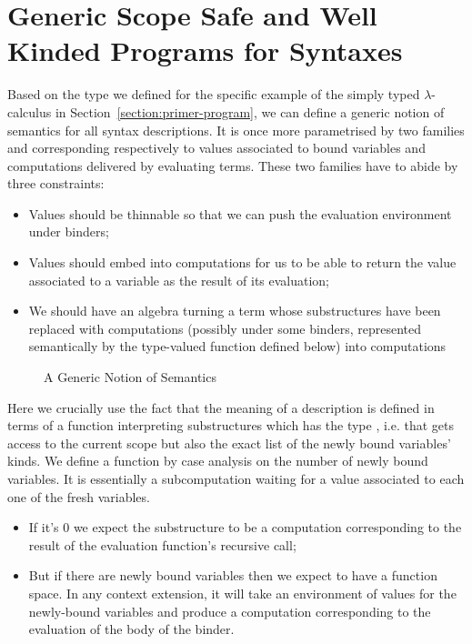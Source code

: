 \section{Generic Scope Safe and Well Kinded Programs for Syntaxes}\label{section:semantics}

Based on the \semrec{} type we defined for the specific example of the
simply typed $\lambda$-calculus in Section~\ref{section:primer-program},
we can define a generic notion of
semantics for all syntax descriptions. It is once more parametrised
by two  families  and  corresponding
respectively to values associated to bound variables and
computations delivered by evaluating terms. These two families
have to abide by three constraints:
\begin{itemize}
\item{} Values should be thinnable so that we can push the
      evaluation environment under binders;
\item{} Values should embed into computations for us to be able
      to return the value associated to a variable as the
      result of its evaluation;
\item{} We should have an algebra turning
      a term whose substructures have been replaced with
      computations (possibly under some binders, represented semantically
      by the  type-valued function defined below) into computations
\end{itemize}

\begin{figure}[h]
\caption{A Generic Notion of Semantics}
\end{figure}

Here we crucially use the fact that the meaning of a description is
defined in terms of a function interpreting substructures which has
the type    , i.e. that gets access
to the current scope but also the exact list of the newly bound variables' kinds.
We define a function  by case analysis on the number of newly bound
variables. It is essentially a subcomputation waiting for a value associated to
each one of the fresh variables.
\begin{itemize}
\item If it's $0$ we expect the substructure to be a computation corresponding
    to the result of the evaluation function's recursive call;
  \item But if there are newly bound variables then we expect to have a function
    space. In any context extension, it will take an environment of values for
    the newly-bound variables and produce a computation corresponding to the
    evaluation of the body of the binder.
\end{itemize}

